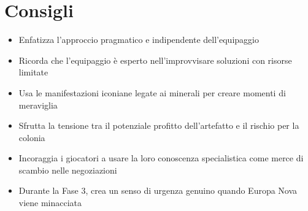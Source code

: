 \documentclass[letterpaper,twocolumn,openany,nodeprecatedcode]{dndbook}
\begin{document}
\section {Consigli}
\begin{itemize}
    \item Enfatizza l'approccio pragmatico e indipendente dell'equipaggio
    \item Ricorda che l'equipaggio è esperto nell'improvvisare soluzioni con risorse limitate
    \item Usa le manifestazioni iconiane legate ai minerali per creare momenti di meraviglia
    \item Sfrutta la tensione tra il potenziale profitto dell'artefatto e il rischio per la colonia
    \item Incoraggia i giocatori a usare la loro conoscenza specialistica come merce di scambio nelle negoziazioni
    \item Durante la Fase 3, crea un senso di urgenza genuino quando Europa Nova viene minacciata
\end{itemize}
\end{document}
